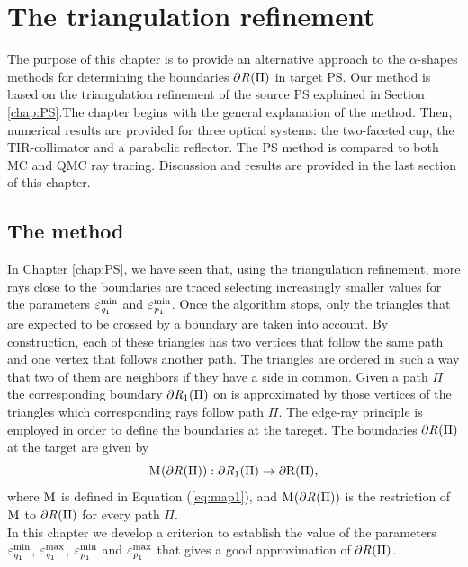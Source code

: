 \chapter{The triangulation refinement}\label{chap:triangulation}
The purpose of this chapter is to provide an alternative approach to the $\alpha$-shapes methods for determining the boundaries $\partial \mbox{$\emph{R}_{\textit{}}$}(\Pi)$ in target PS. 
Our method is based on the triangulation refinement of the source PS explained in Section \ref{chap:PS}.The chapter begins with the general explanation of the method. Then, numerical results are provided for three optical systems: the two-faceted cup, the TIR-collimator and a parabolic reflector. The PS method is compared to both MC and QMC ray tracing. Discussion and results are provided in the last section of this chapter.
\section{The method}
In Chapter \ref{chap:PS}, we have seen that, using the triangulation refinement, more rays close to the boundaries are traced selecting increasingly smaller values for the parameters $\varepsilon_{\textit{q}_1}^{\textrm{min}}$ and $\varepsilon_{\textit{p}_1}^{\textrm{min}}$. Once the algorithm stops, only the triangles that are expected to be crossed by a boundary are taken into account. By construction, each of these triangles has two vertices that follow the same path and one vertex that follows another path.
The triangles are ordered in such a way that two of them are neighbors if they have a side in common. Given a path $\Pi$ the corresponding boundary $\partial\mbox{$\emph{R}_{\textit{$1$}}$}(\Pi)$ on  is approximated by those vertices of the triangles which corresponding rays follow path $\Pi$. The edge-ray principle is employed in order to define the boundaries at the tareget.
The boundaries $\partial \mbox{$\emph{R}_{\textit{}}$}(\Pi)$ at the target are given by
\begin{equation}\mathrm{M}_{\textit{}}(\partial\mbox{$\emph{R}_{\textit{}}$}(\Pi)):\partial\mbox{$\emph{R}_{\textit{$1$}}$}(\Pi)\rightarrow\partial\mbox{{R}{}{}}(\Pi),\end{equation}
where $\mathrm{M}_{\textit{}}$ is defined in Equation (\ref{eq:map1}), and $\mathrm{M}_{\textit{}}(\partial\mbox{$\emph{R}_{\textit{}}$}(\Pi))$ is the restriction of $\mathrm{M}_{\textit{}}$ to $\partial\mbox{$\emph{R}_{\textit{}}$}(\Pi)$ for every path 
$\Pi$. \\\indent In this chapter we develop a criterion to establish the value of the parameters $\varepsilon_{\textit{q}_1}^{\textrm{min}}$, $\varepsilon_{\textit{q}_1}^{\textrm{max}}$, $\varepsilon_{\textit{p}_1}^{\textrm{min}}$ and $\varepsilon_{\textit{p}_1}^{\textrm{max}}$ that gives a good approximation of $\partial \mbox{$\emph{R}_{\textit{}}$}(\Pi)$.
